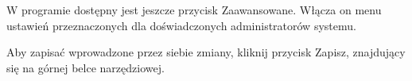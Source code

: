 W programie dostępny jest jeszcze przycisk \textcolor{ubuntu_orange}{Zaawansowane}. Włącza on menu ustawień przeznaczonych dla doświadczonych administratorów systemu.

Aby zapisać wprowadzone przez siebie zmiany, kliknij przycisk \textcolor{ubuntu_orange}{Zapisz}, znajdujący się na górnej belce narzędziowej.
\clearpage
